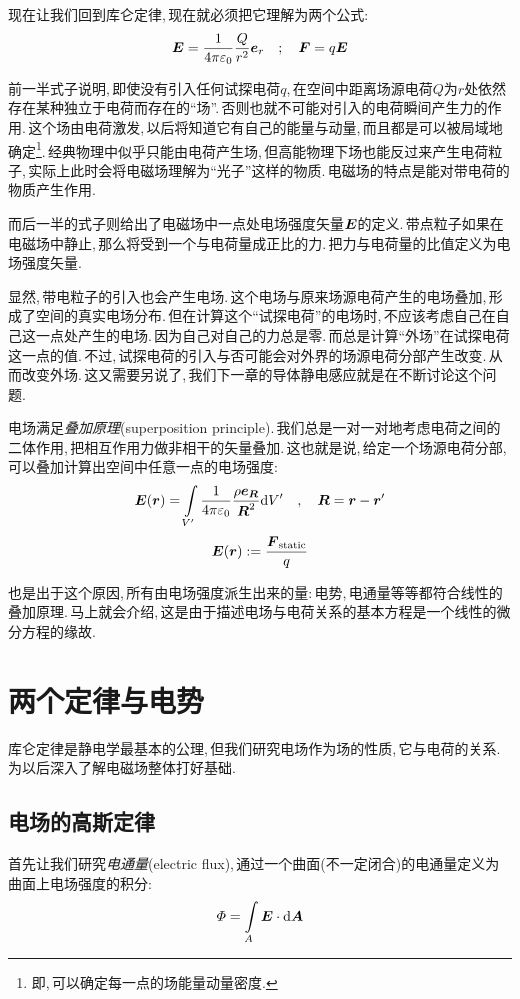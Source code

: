 现在让我们回到库仑定律,\,现在就必须把它理解为两个公式:
\[\boldsymbol{E}=\frac{1}{4\pi\varepsilon_0} \frac{Q}{r^2}\boldsymbol{e}_r\quad ;\quad \boldsymbol{F}=q\boldsymbol{E}\]

前一半式子说明,\,即使没有引入任何试探电荷$q$,\,在空间中距离场源电荷$Q$为$r$处依然存在某种独立于电荷而存在的``场''.\,否则也就不可能对引入的电荷瞬间产生力的作用.\,这个场由电荷激发,\,以后将知道它有自己的能量与动量,\,而且都是可以被局域地确定\footnote{即,\,可以确定每一点的场能量动量密度.}.\,经典物理中似乎只能由电荷产生场,\,但高能物理下场也能反过来产生电荷粒子,\,实际上此时会将电磁场理解为``光子''这样的物质.\,电磁场的特点是能对带电荷的物质产生作用.

而后一半的式子则给出了电磁场中一点处电场强度矢量$\boldsymbol{E}$的定义.\,带点粒子如果在电磁场中静止,\,那么将受到一个与电荷量成正比的力.\,把力与电荷量的比值定义为电场强度矢量.

显然,\,带电粒子的引入也会产生电场.\,这个电场与原来场源电荷产生的电场叠加,\,形成了空间的真实电场分布.\,但在计算这个``试探电荷''的电场时,\,不应该考虑自己在自己这一点处产生的电场.\,因为自己对自己的力总是零.\,而总是计算``外场''在试探电荷这一点的值.\,不过,\,试探电荷的引入与否可能会对外界的场源电荷分部产生改变.\,从而改变外场.\,这又需要另说了,\,我们下一章的导体静电感应就是在不断讨论这个问题.

电场满足\emph{叠加原理}(superposition principle).\,我们总是一对一对地考虑电荷之间的二体作用,\,把相互作用力做非相干的矢量叠加.\,这也就是说,\,给定一个场源电荷分部,\,可以叠加计算出空间中任意一点的电场强度:
\[\boldsymbol{E}(\boldsymbol{r})=\int\limits_{V'} \frac{1}{4\pi\varepsilon_0} \frac{\rho \boldsymbol{e}_{\boldsymbol{R}}}{\boldsymbol{R}^2} \textrm{d} V'\quad,\quad \boldsymbol{R}=\boldsymbol{r}-\boldsymbol{r}'\]
\[\boldsymbol{E}(\boldsymbol{r}):=\frac{\boldsymbol{F}_{\rm static}}{q}\]

也是出于这个原因,\,所有由电场强度派生出来的量:\,电势,\,电通量等等都符合线性的叠加原理.\,马上就会介绍,\,这是由于描述电场与电荷关系的基本方程是一个线性的微分方程的缘故.




\section{两个定律与电势}

库仑定律是静电学最基本的公理,\,但我们研究电场作为场的性质,\,它与电荷的关系.\,为以后深入了解电磁场整体打好基础.

\subsection{电场的高斯定律}

首先让我们研究\emph{电通量}(electric flux),\,通过一个曲面(不一定闭合)的电通量定义为曲面上电场强度的积分:
\[\varPhi=\int\limits_A \boldsymbol{E}\cdot\textrm{d} \boldsymbol{A}\]

